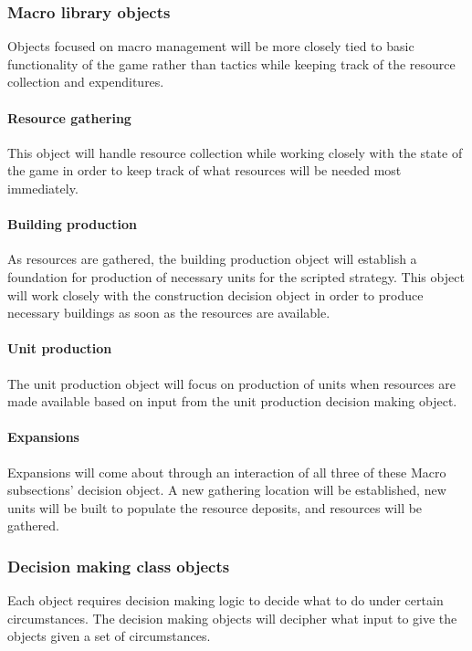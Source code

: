 \documentclass[10pt,letterpaper,onecolumn,draftclsnofoot]{IEEEtran}
\begin{document}
\subsubsection{Macro library objects}
Objects focused on macro management will be more closely tied to basic functionality of the game rather than tactics while keeping track of the resource collection and expenditures.

\paragraph{Resource gathering}
This object will handle resource collection while working closely with the state of the game in order to keep track of what resources will be needed most immediately. 

\paragraph{Building production}
As resources are gathered, the building production object will establish a foundation for production of necessary units for the scripted strategy. This object will work closely with the construction decision object in order to produce necessary buildings as soon as the resources are available.

\paragraph{Unit production}
The unit production object will focus on production of units when resources are made available based on input from the unit production decision making object. 

\paragraph{Expansions}
Expansions will come about through an interaction of all three of these Macro subsections' decision object. A new gathering location will be established, new units will be built to populate the resource deposits, and resources will be gathered.

\subsubsection{Decision making class objects}
Each object requires decision making logic to decide what to do under certain circumstances. The decision making objects will decipher what input to give the objects given a set of circumstances.
\end{document}

